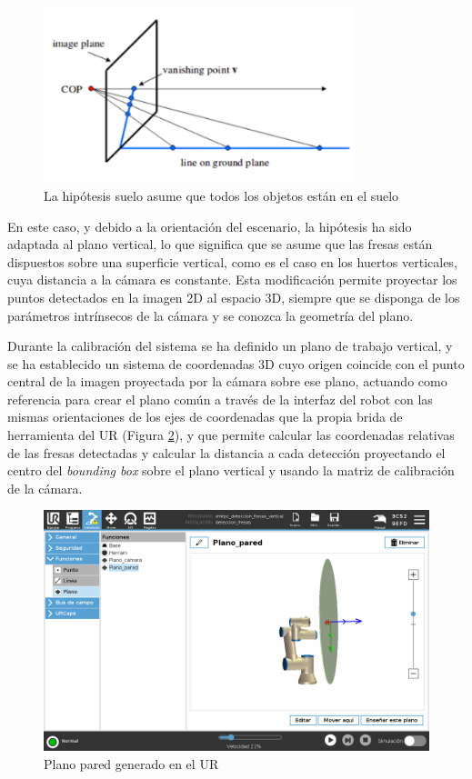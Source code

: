 \begin{figure} [H]
    \begin{center}
      \includegraphics[width=9cm]{figs/Hipotesis suelo.png}
    \end{center}
    \caption{La hipótesis suelo asume que todos los objetos están en el suelo}
    \label{fig:HS}
\end{figure}

En este caso, y debido a la orientación del escenario, la hipótesis ha sido adaptada al plano vertical, lo que significa que se asume que las fresas están dispuestos sobre una superficie vertical, como es el caso en los huertos verticales, cuya distancia a la cámara es constante. Esta modificación permite proyectar los puntos detectados en la imagen 2D al espacio 3D, siempre que se disponga de los parámetros intrínsecos de la cámara y se conozca la geometría del plano.

Durante la calibración del sistema se ha definido un plano de trabajo vertical, y se ha establecido un sistema de coordenadas 3D cuyo origen coincide con el punto central de la imagen proyectada por la cámara sobre ese plano, actuando como referencia para crear el plano común a través de la interfaz del robot con las mismas orientaciones de los ejes de coordenadas que la propia brida de herramienta del UR (Figura \ref{fig:Plano_pared_UR}), y que permite calcular las coordenadas relativas de las fresas detectadas y calcular la distancia a cada detección proyectando el centro del \textit{bounding box} sobre el plano vertical y usando la matriz de calibración de la cámara. 

\begin{figure} [H]
    \begin{center}
      \includegraphics[width=14cm]{figs/Plano Pared Programa UR.png}
    \end{center}
    \caption{Plano pared generado en el UR}
    \label{fig:Plano_pared_UR}
\end{figure}

